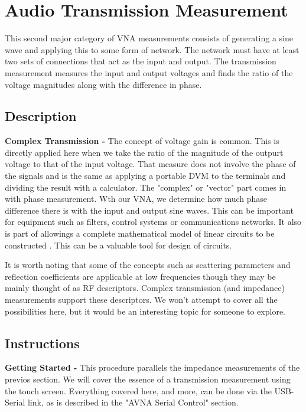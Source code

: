 \section{Audio Transmission Measurement}
This second major category of VNA measurements consists of generating a sine wave and applying this to some form of network.
 The network must have at least two sets of connections that act as the input and output.
The transmission measurement measures the input and output voltages and finds the ratio of the voltage magnitudes along with the difference in phase.
%
\subsection{Description}
\textbf{Complex Transmission - }The concept of voltage gain  is common.
This is directly applied here when we take the ratio of the magnitude of the outpurt voltage to that of the input voltage.
That measure does not involve the phase of the signals and is the same as applying a portable DVM to the terminals and dividing the result with a calculator.
The "complex" or "vector" part comes in with phase measurement.
Wth our VNA, we determine how much phase difference there is with the input and output sine waves.
This can be important for equipment such as  filters, control systems or communications networks.
It also is part of allowings a complete mathematical model of linear circuits to be constructed .  This can be a valuable tool for design of circuits.

It is worth noting that some of the concepts such as scattering parameters and reflection coefficients are applicable at low frequencies though they may be mainly thought of as RF descriptors.  Complex transmission (and impedance) measurements support these descriptors.  We won't attempt to cover all the possibilities here, but it would be an interesting topic for someone to explore.


\subsection{Instructions}
\textbf{Getting Started - }This procedure parallels the impedance measurements of the previos section.
We will cover the essence of a transmission measurement using the touch screen.
Everything covered here, and more, can be done via the USB-Serial link, as is described in the "AVNA Serial Control" section.

